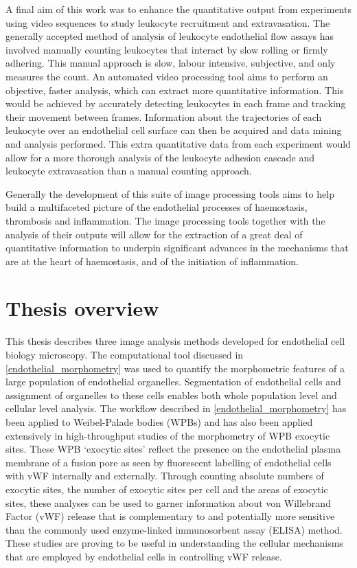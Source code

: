 A final aim of this work was to enhance the quantitative output from experiments using video sequences to study leukocyte recruitment and extravasation. The generally accepted method of analysis of leukocyte endothelial flow assays has involved manually counting leukocytes that interact by slow rolling or firmly adhering. This manual approach is slow, labour intensive, subjective, and only measures the count. An automated video processing tool aims to perform an objective, faster analysis, which can extract more quantitative information. This would be achieved by accurately detecting leukocytes in each frame and tracking their movement between frames. Information about the trajectories of each leukocyte over an endothelial cell surface can then be acquired and data mining and analysis performed. This extra quantitative data from each experiment would allow for a more thorough analysis of the leukocyte adhesion cascade and leukocyte extravasation than a manual counting approach.

Generally the development of this suite of image processing tools aims to help build a multifaceted picture of the endothelial processes of haemostasis, thrombosis and inflammation. The image processing tools together with the analysis of their outputs will allow for the extraction of a great deal of quantitative information to underpin significant advances in the mechanisms that are at the heart of haemostasis, and of the initiation of inflammation.

\section{Thesis overview}
\label{introduction:overview}
 This thesis describes three image analysis methods developed for endothelial cell biology microscopy. The computational tool discussed in \autoref{endothelial_morphometry} was used to quantify the morphometric features of a large population of endothelial organelles. Segmentation of endothelial cells and assignment of organelles to these cells enables both whole population level and cellular level analysis. The workflow described in \autoref{endothelial_morphometry} has been applied to Weibel-Palade bodies (WPBs) and has  also been applied extensively in high-throughput studies of the morphometry of WPB exocytic sites. These WPB `exocytic sites' reflect the presence on the endothelial plasma membrane of a fusion pore as seen by fluorescent labelling of endothelial cells with vWF internally and externally. Through counting absolute numbers of exocytic sites, the number of exocytic sites per cell and the areas of exocytic sites, these analyses can be used to garner information about von Willebrand Factor (vWF) release that is complementary to and potentially more sensitive than the commonly used enzyme-linked immunosorbent assay (ELISA) method. These studies are proving to be useful in understanding the cellular mechanisms that are employed by endothelial cells in controlling vWF release.

